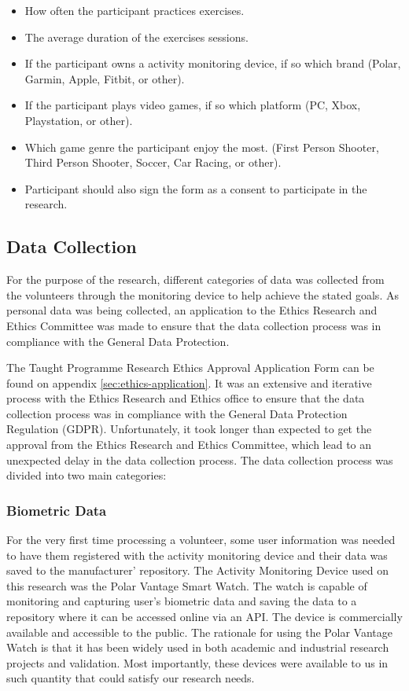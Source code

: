 \begin{itemize}
    \item How often the participant practices exercises.
    \item The average duration of the exercises sessions.
    \item If the participant owns a activity monitoring device, if so which brand (Polar, Garmin, Apple, Fitbit, or other).
    \item If the participant plays video games, if so which platform (PC, Xbox, Playstation, or other).
    \item Which game genre the participant enjoy the most. (First Person Shooter, Third Person Shooter, Soccer, Car Racing, or other).
    \item Participant should also sign the form as a consent to participate in the research.
\end{itemize}

\subsection{Data Collection}

For the purpose of the research, different categories of data was collected from the volunteers through the monitoring device to help achieve the stated goals. As personal data was
being collected, an application to the Ethics Research and Ethics Committee was made to ensure that the data collection process was in compliance with the General Data Protection.

\par 
The Taught Programme Research Ethics Approval Application Form can be found on appendix \ref{sec:ethics-application}. It was an extensive and iterative process with the Ethics Research and Ethics 
office to ensure that the data collection process was in compliance with the General Data Protection Regulation (GDPR). Unfortunately, it took longer than expected to get the approval
from the Ethics Research and Ethics Committee, which lead to an unexpected delay in the data collection process. The data collection process was divided into two main categories:

\subsubsection*{Biometric Data}

For the very first time processing a volunteer, some user information was needed to have them registered with the activity monitoring device and their data was saved to the manufacturer'
repository. The Activity Monitoring Device used on this research was the Polar Vantage Smart Watch. The watch is capable of monitoring and capturing user’s biometric data and saving the
data to a repository where it can be accessed online via an API. The device is commercially available and accessible to the public. The rationale for using the Polar Vantage Watch is
that it has been widely used in both academic and industrial research projects and validation. Most importantly, these devices were available to us in such quantity that could satisfy
our research needs.

